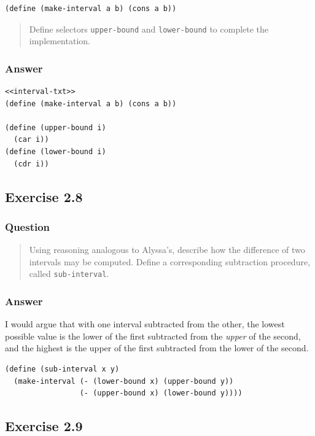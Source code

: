 \documentclass[final,fleqn,titlepage]{article}
\begin{document}
\begin{verbatim}
(define (make-interval a b) (cons a b))
\end{verbatim}

\begin{quote}
Define selectors \texttt{upper-bound} and \texttt{lower-bound} to complete the
implementation.
\end{quote}

\subsubsection{Answer}
\label{sec:org625b178}
\begin{verbatim}
<<interval-txt>>
(define (make-interval a b) (cons a b))

(define (upper-bound i)
  (car i))
(define (lower-bound i)
  (cdr i))
\end{verbatim}

\subsection{Exercise 2.8}
\label{sec:orgd00eaf1}
\subsubsection{Question}
\label{sec:org545cc3e}
\begin{quote}
Using reasoning analogous to Alyssa's, describe how the difference of two
intervals may be computed. Define a corresponding subtraction procedure, called
\texttt{sub-interval}.
\end{quote}
\subsubsection{Answer}
\label{sec:org744e6af}
I would argue that with one interval subtracted from the other, the lowest
possible value is the lower of the first subtracted from the \emph{upper} of the
second, and the highest is the upper of the first subtracted from the lower of
the second.
\begin{verbatim}
(define (sub-interval x y)
  (make-interval (- (lower-bound x) (upper-bound y))
                 (- (upper-bound x) (lower-bound y))))
\end{verbatim}
\subsection{Exercise 2.9}
\label{sec:org6e454d9}
\end{document}
